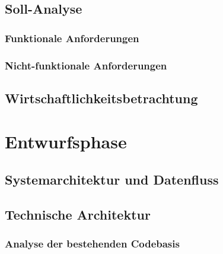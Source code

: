 \documentclass[11pt,a4paper]{article}
\begin{document}
\subsection{Soll-Analyse}

\subsubsection{Funktionale Anforderungen}

\subsubsection{Nicht-funktionale Anforderungen}

\subsection{Wirtschaftlichkeitsbetrachtung}

\newpage
\section{Entwurfsphase}

\subsection{Systemarchitektur und Datenfluss}

\subsection{Technische Architektur}

\subsubsection{Analyse der bestehenden Codebasis}
\end{document}
